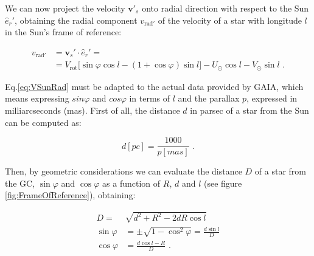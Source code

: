 \noindent 
We can now project the velocity $\bm{v'}_s$ onto radial direction with respect to the Sun $\hat{e}_r'$,
obtaining the radial component $v_{\text{rad}'}$ of the velocity of a star with longitude $l$ in the Sun's frame of reference:

\begin{equation}\label{eq:VSunRad}
    \begin{aligned}
        v_{\text{rad}'}  &= \bm{v}_s' \cdot \hat{e}_r' = \\ 
        &=V_{\text{rot}} \biggl[ \sin\varphi \cos l - (1 + \cos\varphi)\sin l \biggr] - U_{\odot} \cos l - V_{\odot} \sin l \text{ .}
    \end{aligned}
\end{equation}
\noindent

Eq.\ref{eq:VSunRad} must be adapted to the actual data provided by GAIA, which means expressing $sin\varphi$ and $cos\varphi$ in terms of $l$ and the parallax $p$, expressed in milliarcseconds (\unit{mas}). First of all, the distance $d$ in parsec of a star from the Sun can be computed as:

\begin{equation}\label{eq:DistanceParallax}
    d[\unit{pc}] = \frac{1000}{p[\unit{mas}]} \text{ .}
\end{equation}

\noindent
Then, by geometric considerations we can evaluate the distance $D$ of a star from the GC, $\sin\varphi$ and $\cos\varphi$ as a function of $R$, $d$ and $l$ (see figure \ref{fig:FrameOfReference}), obtaining:

\begin{equation}\label{eq:Geometry}
    \begin{aligned}
        D=&\sqrt{d^2 + R^2 - 2dR \cos l} \\
        \sin\varphi &= \pm \sqrt{1 - \cos^2 \varphi} = \frac{d\sin l}{D}\\
        \cos\varphi &= \frac{d \cos l - R}{D} \text{ .}
    \end{aligned}
\end{equation}

